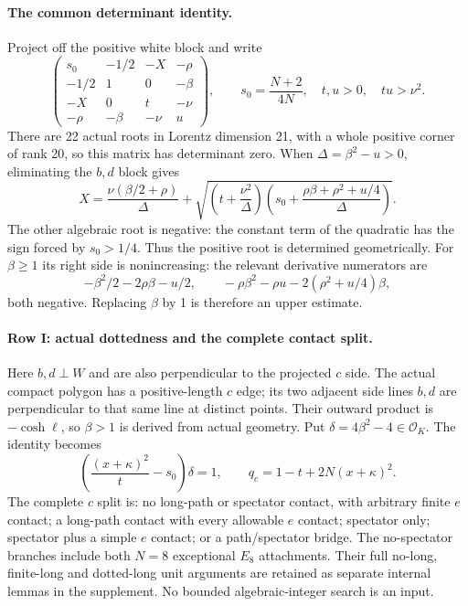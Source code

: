 \paragraph{The common determinant identity.}
Project off the positive white block and write
\[
 \begin{pmatrix}
 s_0&-1/2&-X&-\rho\\
 -1/2&1&0&-\beta\\
 -X&0&t&-\nu\\
 -\rho&-\beta&-\nu&u
 \end{pmatrix},\qquad
 s_0=\frac{N+2}{4N},\quad t,u>0,\quad tu>\nu^2.
\]
There are 22 actual roots in Lorentz dimension 21, with a whole positive
corner of rank 20, so this matrix has determinant zero. When
$\Delta=\beta^2-u>0$, eliminating the $b,d$ block gives
\begin{equation}\label{eq:eight-schur}
 X=\frac{\nu(\beta/2+\rho)}\Delta+
 \sqrt{\left(t+\frac{\nu^2}\Delta\right)
 \left(s_0+\frac{\rho\beta+\rho^2+u/4}\Delta\right)}.
\end{equation}
The other algebraic root is negative: the constant term of the
quadratic has the sign forced by $s_0>1/4$. Thus the positive root
is determined geometrically. For $\beta\ge1$ its right side is
nonincreasing: the relevant derivative numerators are
\[
 -\beta^2/2-2\rho\beta-u/2,\qquad
 -\rho\beta^2-\rho u-2(\rho^2+u/4)\beta,
\]
both negative. Replacing $\beta$ by 1 is therefore an upper estimate.

\paragraph{Row I: actual dottedness and the complete contact split.}
Here $b,d\perp W$ and are also perpendicular to the projected $c$
side. The actual compact polygon has a positive-length $c$ edge;
its two adjacent side lines $b,d$ are perpendicular to that same
line at distinct points. Their outward product is
$-\cosh\ell$, so $\beta>1$ is derived from actual geometry.
Put $\delta=4\beta^2-4\in\mathcal O_K$. The identity becomes
\begin{equation}\label{eq:eight-I}
 \left(\frac{(x+\kappa)^2}{t}-s_0\right)\delta=1,
 \qquad q_c=1-t+2N(x+\kappa)^2.
\end{equation}
The complete $c$ split is: no long-path or spectator contact, with
arbitrary finite $e$ contact; a long-path contact with every allowable
$e$ contact; spectator only; spectator plus a simple $e$ contact; or a path/spectator
bridge. The no-spectator branches include both $N=8$ exceptional
$E_8$ attachments. Their full no-long, finite-long and dotted-long
unit arguments are retained as separate internal lemmas in the
supplement. No bounded algebraic-integer search is an input.

